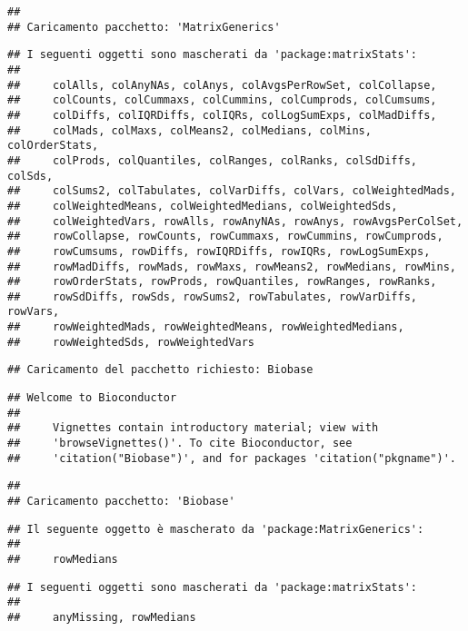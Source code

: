 \documentclass[
]{article}
\begin{document}
\begin{verbatim}
## 
## Caricamento pacchetto: 'MatrixGenerics'
\end{verbatim}

\begin{verbatim}
## I seguenti oggetti sono mascherati da 'package:matrixStats':
## 
##     colAlls, colAnyNAs, colAnys, colAvgsPerRowSet, colCollapse,
##     colCounts, colCummaxs, colCummins, colCumprods, colCumsums,
##     colDiffs, colIQRDiffs, colIQRs, colLogSumExps, colMadDiffs,
##     colMads, colMaxs, colMeans2, colMedians, colMins, colOrderStats,
##     colProds, colQuantiles, colRanges, colRanks, colSdDiffs, colSds,
##     colSums2, colTabulates, colVarDiffs, colVars, colWeightedMads,
##     colWeightedMeans, colWeightedMedians, colWeightedSds,
##     colWeightedVars, rowAlls, rowAnyNAs, rowAnys, rowAvgsPerColSet,
##     rowCollapse, rowCounts, rowCummaxs, rowCummins, rowCumprods,
##     rowCumsums, rowDiffs, rowIQRDiffs, rowIQRs, rowLogSumExps,
##     rowMadDiffs, rowMads, rowMaxs, rowMeans2, rowMedians, rowMins,
##     rowOrderStats, rowProds, rowQuantiles, rowRanges, rowRanks,
##     rowSdDiffs, rowSds, rowSums2, rowTabulates, rowVarDiffs, rowVars,
##     rowWeightedMads, rowWeightedMeans, rowWeightedMedians,
##     rowWeightedSds, rowWeightedVars
\end{verbatim}

\begin{verbatim}
## Caricamento del pacchetto richiesto: Biobase
\end{verbatim}

\begin{verbatim}
## Welcome to Bioconductor
## 
##     Vignettes contain introductory material; view with
##     'browseVignettes()'. To cite Bioconductor, see
##     'citation("Biobase")', and for packages 'citation("pkgname")'.
\end{verbatim}

\begin{verbatim}
## 
## Caricamento pacchetto: 'Biobase'
\end{verbatim}

\begin{verbatim}
## Il seguente oggetto è mascherato da 'package:MatrixGenerics':
## 
##     rowMedians
\end{verbatim}

\begin{verbatim}
## I seguenti oggetti sono mascherati da 'package:matrixStats':
## 
##     anyMissing, rowMedians
\end{verbatim}
\end{document}
